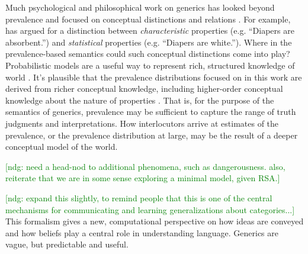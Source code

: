 \documentclass[10pt,letterpaper]{article}
\newcommand{\ndg}[1]{\textcolor{Green}{[ndg: #1]}}
\begin{document}

Much psychological and philosophical work on generics has looked beyond prevalence and focused on conceptual distinctions and relations \cite{Prasada2013, Leslie2008}. For example, \citeauthor{Prasada2013} has argued for a distinction between \emph{characteristic} properties (e.g. ``Diapers are absorbent.'') and \emph{statistical} properties (e.g. ``Diapers are white.'').
 Where in the prevalence-based semantics could such conceptual distinctions come into play?
Probabilistic models are a useful way to represent rich, structured knowledge of world \cite{Goodmanconcepts}. It's plausible that the prevalence distributions focused on in this work are derived from richer conceptual knowledge, including higher-order conceptual knowledge about the nature of properties \cite{Gelman2005, Keil1992}. That is, for the purpose of the semantics of generics, prevalence may be sufficient to capture the range of truth judgments and interpretations. How interlocutors arrive at estimates of the prevalence, or the prevalence distribution at large, may be the result of a deeper conceptual model of the world. 

\ndg{need a head-nod to additional phenomena, such as dangerousness. also, reiterate that we are in some sense exploring a minimal model, given RSA.}

\ndg{expand this slightly, to remind people that this is one of the central mechanisms for communicating and learning generalizations about categories...}
This formalism gives a new, computational perspective on how ideas are conveyed and how beliefs play a central role in understanding language.
Generics are vague, but predictable and useful.




\setlength{\bibleftmargin}{.125in}
\setlength{\bibindent}{-\bibleftmargin}


\end{document}
